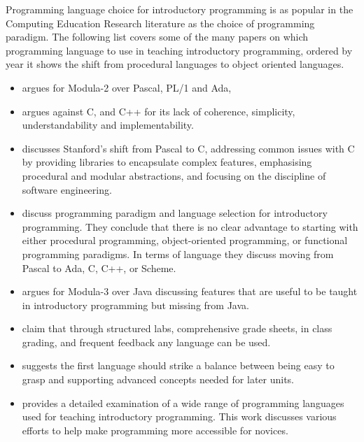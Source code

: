 Programming language choice for introductory programming is as popular in the Computing Education Research literature as the choice of programming paradigm. The following list covers some of the many papers on which programming language to use in teaching introductory programming, ordered by year it shows the shift from procedural languages to object oriented languages.

\begin{itemize}
	\item \citet{Koffman:1988} argues for Modula-2 over Pascal, PL/1 and Ada, 
	\item \citet{Mody:1991} argues against C, and C++ for its lack of coherence, simplicity, understandability and implementability. 

	\item \citet{Roberts:1993} discusses Stanford's shift from Pascal to C, addressing common issues with C by providing libraries to encapsulate complex features, emphasising procedural and modular abstractions, and focusing on the discipline of software engineering.

	\item \citet{Brilliant:1996} discuss programming paradigm and language selection for introductory programming. They conclude that there is no clear advantage to starting with either procedural programming, object-oriented programming, or functional programming paradigms. In terms of language they discuss moving from Pascal to Ada, C, C++, or Scheme.

	\item \citet{Boszormenyi:1998} argues for Modula-3 over Java discussing features that are useful to be taught in introductory programming but missing from Java.

	\item \citet{Howell:2003} claim that through structured labs, comprehensive grade sheets, in class grading, and frequent feedback any language can be used.

	\item \citet{Gupta:2004} suggests the first language should strike a balance between being easy to grasp and supporting advanced concepts needed for later units.

	\item \citet{Kelleher:2005} provides a detailed examination of a wide range of programming languages used for teaching introductory programming. This work discusses various efforts to help make programming more accessible for novices.


\end{itemize}
